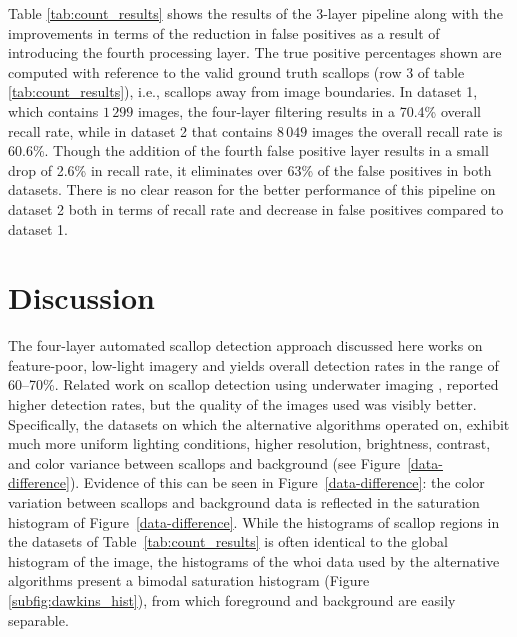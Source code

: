 \documentclass {udthesis}
\begin{document}
Table \ref{tab:count_results} shows the results of the 3-layer pipeline along with the improvements in terms of the reduction in false positives as a result of introducing the fourth processing layer. 
The true positive percentages shown are computed with reference to the valid ground truth scallops (row 3 of table \ref{tab:count_results}), i.e., scallops away from image boundaries.  
In dataset 1, which contains $1\,299$ images, the four-layer filtering results in a 70.4\% overall recall rate, while in dataset 2 that contains $8\,049$ images the overall recall rate is 60.6\%.  Though the addition of the fourth false positive layer results in a small drop of 2.6\% in recall rate, it eliminates over 63\% of the false positives in both datasets.
There is no clear reason for the better performance of this pipeline on dataset 2 both in terms of recall rate and decrease in false positives compared to dataset 1.

\section{Discussion}
\label{sec:scallop_discussion}

The four-layer automated scallop detection approach discussed
here works on feature-poor, low-light imagery and yields
overall detection rates in the range of 60--70\%. 
Related work on scallop detection using underwater imaging \cite{dawkins11,dawkings13},
reported higher detection rates, but the quality of the images used was visibly better.  Specifically,
the datasets on which the 
alternative algorithms \cite{dawkings13}
operated on, exhibit much more uniform lighting conditions, higher resolution,
brightness, contrast, and color variance between scallops and background 
(see Figure~\ref{data-difference}). 
Evidence of this can be seen in Figure~\ref{data-difference}: the color variation between scallops and background data is reflected in the
saturation histogram of Figure~\ref{data-difference}. While the histograms
of scallop regions in the datasets of Table~\ref{tab:count_results} is often 
identical to the global histogram of the image, the histograms of the \gls{whoi} data used by the alternative algorithms \cite{dawkings13} present a bimodal saturation histogram
(Figure \ref{subfig:dawkins_hist}), from which 
foreground and background are easily separable.
\end{document}
